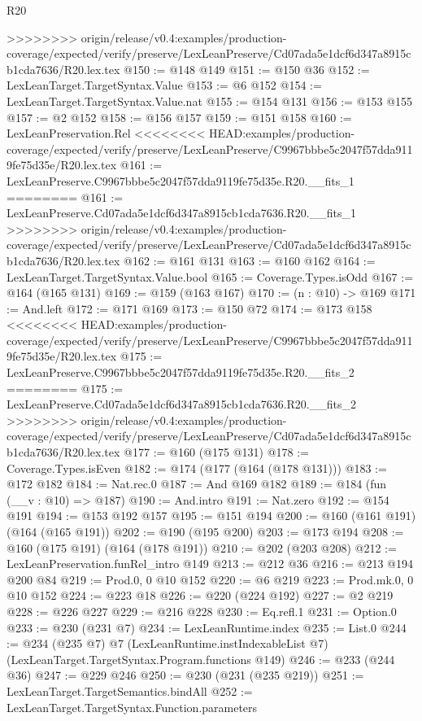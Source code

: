 \begin{lexlean}{R20}
\begin{coremodule}
{{{{{{{{{{{>>>>>>>> origin/release/v0.4:examples/production-coverage/expected/verify/preserve/LexLeanPreserve/Cd07ada5e1dcf6d347a8915cb1cda7636/R20.lex.tex
@150 := @148 @149
@151 := @150 @36
@152 := LexLeanTarget.TargetSyntax.Value
@153 := @6 @152
@154 := LexLeanTarget.TargetSyntax.Value.nat
@155 := @154 @131
@156 := @153 @155
@157 := @2 @152
@158 := @156 @157
@159 := @151 @158
@160 := LexLeanPreservation.Rel
<<<<<<<< HEAD:examples/production-coverage/expected/verify/preserve/LexLeanPreserve/C9967bbbe5c2047f57dda9119fe75d35e/R20.lex.tex
@161 := LexLeanPreserve.C9967bbbe5c2047f57dda9119fe75d35e.R20.__fits_1
========
@161 := LexLeanPreserve.Cd07ada5e1dcf6d347a8915cb1cda7636.R20.__fits_1
>>>>>>>> origin/release/v0.4:examples/production-coverage/expected/verify/preserve/LexLeanPreserve/Cd07ada5e1dcf6d347a8915cb1cda7636/R20.lex.tex
@162 := @161 @131
@163 := @160 @162
@164 := LexLeanTarget.TargetSyntax.Value.bool
@165 := Coverage.Types.isOdd
@167 := @164 (@165 @131)
@169 := @159 (@163 @167)
@170 := (n : @10) -> @169
@171 := And.left
@172 := @171 @169
@173 := @150 @72
@174 := @173 @158
<<<<<<<< HEAD:examples/production-coverage/expected/verify/preserve/LexLeanPreserve/C9967bbbe5c2047f57dda9119fe75d35e/R20.lex.tex
@175 := LexLeanPreserve.C9967bbbe5c2047f57dda9119fe75d35e.R20.__fits_2
========
@175 := LexLeanPreserve.Cd07ada5e1dcf6d347a8915cb1cda7636.R20.__fits_2
>>>>>>>> origin/release/v0.4:examples/production-coverage/expected/verify/preserve/LexLeanPreserve/Cd07ada5e1dcf6d347a8915cb1cda7636/R20.lex.tex
@177 := @160 (@175 @131)
@178 := Coverage.Types.isEven
@182 := @174 (@177 (@164 (@178 @131)))
@183 := @172 @182
@184 := Nat.rec.{0}
@187 := And @169 @182
@189 := @184 (fun (__v : @10) => @187)
@190 := And.intro
@191 := Nat.zero
@192 := @154 @191
@194 := @153 @192 @157
@195 := @151 @194
@200 := @160 (@161 @191) (@164 (@165 @191))
@202 := @190 (@195 @200)
@203 := @173 @194
@208 := @160 (@175 @191) (@164 (@178 @191))
@210 := @202 (@203 @208)
@212 := LexLeanPreservation.funRel_intro @149
@213 := @212 @36
@216 := @213 @194 @200 @84
@219 := Prod.{0, 0} @10 @152
@220 := @6 @219
@223 := Prod.mk.{0, 0} @10 @152
@224 := @223 @18
@226 := @220 (@224 @192)
@227 := @2 @219
@228 := @226 @227
@229 := @216 @228
@230 := Eq.refl.{1}
@231 := Option.{0}
@233 := @230 (@231 @7)
@234 := LexLeanRuntime.index
@235 := List.{0}
@244 := @234
    (@235 @7)
    @7
    (LexLeanRuntime.instIndexableList @7)
    (LexLeanTarget.TargetSyntax.Program.functions @149)
@246 := @233 (@244 @36)
@247 := @229 @246
@250 := @230 (@231 (@235 @219))
@251 := LexLeanTarget.TargetSemantics.bindAll
@252 := LexLeanTarget.TargetSyntax.Function.parameters
}}}}}}}}}}}
\end{coremodule}
\end{lexlean}

